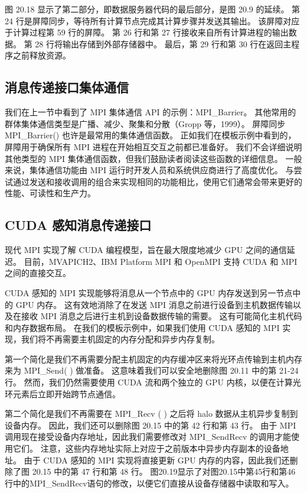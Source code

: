 图 20.18 显示了第二部分，即数据服务器代码的最后部分，是图 20.9 的延续。 第 24 行是屏障同步，等待所有计算节点完成其计算步骤并发送其输出。 该屏障对应于计算过程第 59 行的屏障。 第 26 行和第 27 行接收来自所有计算进程的输出数据。 第 28 行将输出存储到外部存储器中。 最后，第 29 行和第 30 行在返回主程序之前释放资源。

\subsection{消息传递接口集体通信}
我们在上一节中看到了 MPI 集体通信 API 的示例：MPI\_Barrier。 其他常用的群体集体通信类型是广播、减少、聚集和分散（Gropp 等，1999）。 屏障同步 MPI\_Barrier() 也许是最常用的集体通信函数。 正如我们在模板示例中看到的，屏障用于确保所有 MPI 进程在开始相互交互之前都已准备好。 我们不会详细说明其他类型的 MPI 集体通信函数，但我们鼓励读者阅读这些函数的详细信息。 一般来说，集体通信功能由 MPI 运行时开发人员和系统供应商进行了高度优化。 与尝试通过发送和接收调用的组合来实现相同的功能相比，使用它们通常会带来更好的性能、可读性和生产力。

\subsection{CUDA 感知消息传递接口}
现代 MPI 实现了解 CUDA 编程模型，旨在最大限度地减少 GPU 之间的通信延迟。 目前，MVAPICH2、IBM Platform MPI 和 OpenMPI 支持 CUDA 和 MPI 之间的直接交互。

CUDA 感知的 MPI 实现能够将消息从一个节点中的 GPU 内存发送到另一节点中的 GPU 内存。 这有效地消除了在发送 MPI 消息之前进行设备到主机数据传输以及在接收 MPI 消息之后进行主机到设备数据传输的需要。 这有可能简化主机代码和内存数据布局。 在我们的模板示例中，如果我们使用 CUDA 感知的 MPI 实现，我们将不再需要主机固定的内存分配和异步内存复制。

第一个简化是我们不再需要分配主机固定的内存缓冲区来将光环点传输到主机内存来为 MPI\_Send( ) 做准备。 这意味着我们可以安全地删除图 20.11 中的第 21-24 行。 然而，我们仍然需要使用 CUDA 流和两个独立的 GPU 内核，以便在计算光环元素后立即开始跨节点通信。

第二个简化是我们不再需要在 MPI\_Recv ( ) 之后将 halo 数据从主机异步复制到设备内存。 因此，我们还可以删除图 20.15 中的第 42 行和第 43 行。 由于 MPI 调用现在接受设备内存地址，因此我们需要修改对 MPI\_SendRecv 的调用才能使用它们。 注意，这些内存地址实际上对应于之前版本中异步内存副本的设备地址。 由于 CUDA 感知的 MPI 实现将直接更新 GPU 内存的内容，因此我们还删除了图 20.15 中的第 47 行和第 48 行。 图20.19显示了对图20.15中第45行和第46行中的MPI\_SendRecv语句的修改，以便它们直接从设备存储器中读取和写入。

